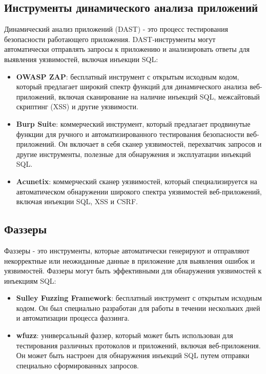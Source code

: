 \documentclass[a4paper,12pt]{diplom}
\begin{document}
	 \subsection{Инструменты динамического анализа приложений}
	 
	 Динамический анализ приложений (DAST) - это процесс тестирования безопасности работающего приложения.  DAST-инструменты могут автоматически отправлять запросы к приложению и анализировать ответы для выявления уязвимостей,  включая инъекции SQL:
	 
	 \begin{itemize}
	 	\item \textbf{OWASP ZAP}:  бесплатный инструмент с открытым исходным кодом,  который предлагает широкий спектр функций для динамического анализа веб-приложений,  включая сканирование на наличие инъекций SQL,  межсайтовый скриптинг (XSS) и другие уязвимости. \cite{ZAP_tool}
	 	\item \textbf{Burp Suite}:  коммерческий инструмент, который предлагает продвинутые функции для ручного и автоматизированного тестирования безопасности веб-приложений.  Он включает в себя сканер уязвимостей,  перехватчик запросов и другие инструменты,  полезные для обнаружения и эксплуатации инъекций SQL. \cite{Burp_Suite_tool}
	 	\item \textbf{Acunetix}:  коммерческий сканер уязвимостей, который специализируется на автоматическом обнаружении широкого спектра уязвимостей веб-приложений,  включая инъекции SQL,  XSS и CSRF. \cite{Acunetix_tool}
	 \end{itemize}
	 
	 \subsection{Фаззеры}
	 
	 Фаззеры - это инструменты, которые автоматически генерируют и отправляют некорректные или неожиданные данные в приложение для выявления ошибок и уязвимостей.  Фаззеры могут быть эффективными для обнаружения уязвимостей к инъекциям SQL:
	 
	 \begin{itemize}
	 	\item \textbf{Sulley Fuzzing Framework}:  бесплатный инструмент с открытым исходным кодом. Он был специально разработан для работы в течении нескольких дней и автоматизации процесса фаззинга. \cite{Sulley_tool}
	 	\item \textbf{wfuzz}:  универсальный фаззер,  который может быть использован для тестирования различных протоколов и приложений,  включая веб-приложения.  Он может быть настроен для обнаружения инъекций SQL путем отправки специально сформированных запросов. \cite{Wfuzz_tool}
	 \end{itemize}
	 	
\end{document}
